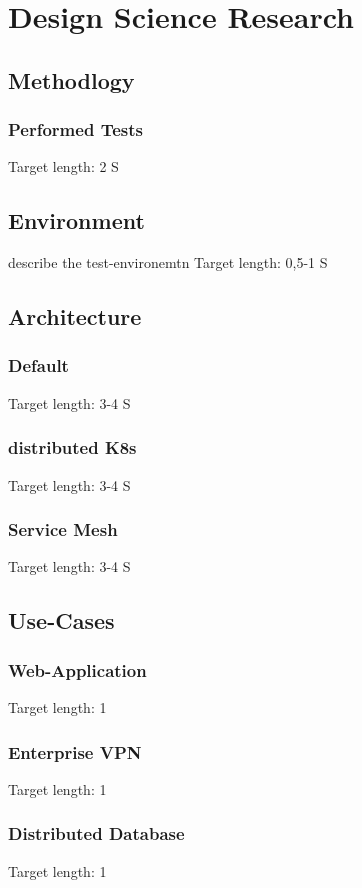 \documentclass[MSC,Master,english]{twbook}%
\begin{document}
\chapter{Design Science Research}
\label{chap:dsr}

\section{Methodlogy}
\label{sec:dsrmethode}
\subsection{Performed Tests}
Target length: 2 S

\section{Environment}
\label{sec:env}
describe the test-environemtn
Target length: 0,5-1 S

\section{Architecture}
\label{sec:dsrarchitecture}
\subsection{Default}
Target length: 3-4 S
\subsection{distributed K8s}
Target length: 3-4 S
\subsection{Service Mesh}
Target length: 3-4 S

\section{Use-Cases}
\subsection{Web-Application}
Target length: 1
\subsection{Enterprise VPN}
Target length: 1
\subsection{Distributed Database}
Target length: 1
\end{document}

